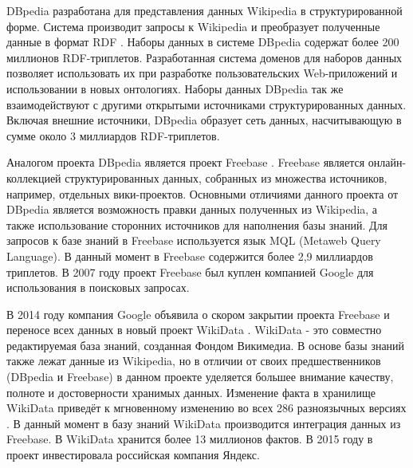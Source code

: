 DBpedia разработана для представления данных Wikipedia в структурированной форме. Система производит запросы к Wikipedia и преобразует полученные данные в формат RDF \cite{auer2007dbpedia}. Наборы данных в системе DBpedia содержат более 200 миллионов RDF-триплетов. Разработанная система доменов для наборов данных позволяет использовать их при разработке пользовательских Web-приложений и использовании в новых онтологиях. Наборы данных DBpedia так же взаимодействуют с другими открытыми источниками структурированных данных. Включая внешние источники, DBpedia образует сеть данных, насчитывающую в сумме около 3 миллиардов RDF-триплетов.  

Аналогом проекта DBpedia является проект Freebase \cite{bollacker2008freebase}. Freebase является онлайн-коллекцией структурированных данных, собранных из множества источников, например, отдельных вики-проектов. Основными отличиями данного проекта от DBpedia является возможность правки данных полученных из Wikipedia, а также использование сторонних источников для наполнения базы знаний. Для запросов к базе знаний в Freebase используется язык MQL (Metaweb Query Language). В данный момент в Freebase содержится более 2,9 миллиардов триплетов. В 2007 году проект Freebase был куплен компанией Google для использования в поисковых запросах.

В 2014 году компания Google объявила о скором закрытии проекта Freebase и переносе всех данных в новый проект WikiData \cite{vrandevcic2014wikidata}. WikiData - это совместно редактируемая база знаний, созданная Фондом Викимедиа. В основе базы знаний также лежат данные из Wikipedia, но в отличии от своих предшественников (DBpedia и Freebase) в данном проекте уделяется большее внимание качеству, полноте и достоверности хранимых данных. Изменение факта в хранилище WikiData приведёт к мгновенному изменению во всех 286 разноязычных версиях \cite{vrandecic2013rise}. В данный момент в базу знаний WikiData производится интеграция данных из Freebase. В WikiData хранится более 13 миллионов фактов. В 2015 году в проект инвестировала российская компания Яндекс.

